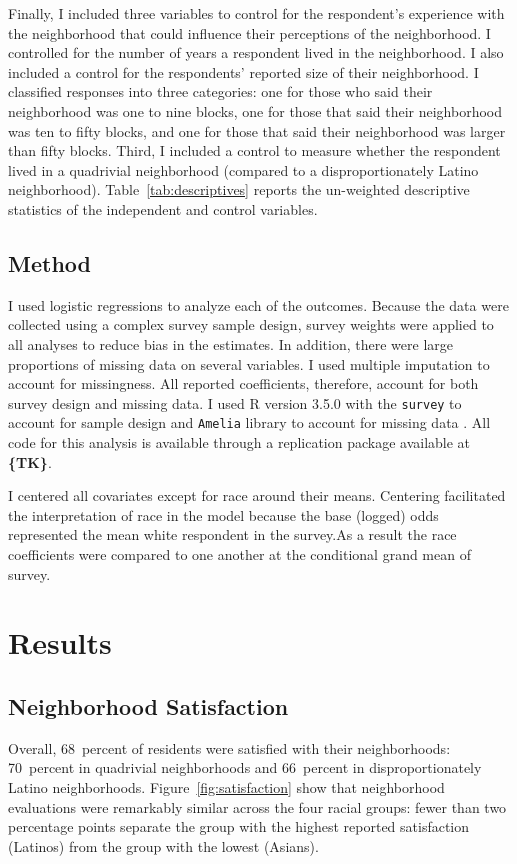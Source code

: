 \documentclass[11pt]{baderart}
\newcommand{\TK}{\textbf{\{TK\}}}
\begin{document}
Finally, I included three variables to control for the respondent's experience with the neighborhood that could influence their perceptions of the neighborhood. I controlled for the number of years a respondent lived in the neighborhood. I also included a control for the respondents' reported size of their neighborhood. I classified responses into three categories: one for those who said their neighborhood was one to nine blocks, one for those that said their neighborhood was ten to fifty blocks, and one for those that said their neighborhood was larger than fifty blocks. Third, I included a control to measure whether the respondent lived in a quadrivial neighborhood (compared to a disproportionately Latino neighborhood). Table~\ref{tab:descriptives} reports the un-weighted descriptive statistics of the independent and control variables. 


\subsection{Method}
I used logistic regressions to analyze each of the outcomes. Because the data were collected using a complex survey sample design, survey weights were applied to all analyses to reduce bias in the estimates. In addition, there were large proportions of missing data on several variables. I used multiple imputation to account for missingness. All reported coefficients, therefore, account for both survey design and missing data. I used R version 3.5.0 with the \texttt{survey} to account for sample design and \texttt{Amelia} library to account for missing data \needcite. All code for this analysis is available through a replication package available at \TK.

I centered all covariates except for race around their means. Centering facilitated the interpretation of race in the model because the base (logged) odds represented the mean white respondent in the survey.As a result the race coefficients were compared to one another at the conditional grand mean of survey. 

\section{Results}
\subsection{Neighborhood Satisfaction}
Overall, 68~percent of residents were satisfied with their neighborhoods: 70~percent in quadrivial neighborhoods and 66~percent in disproportionately Latino neighborhoods. Figure~\ref{fig:satisfaction} show that neighborhood evaluations were remarkably similar across the four racial groups: fewer than two percentage points separate the group with the highest reported satisfaction (Latinos) from the group with the lowest (Asians). 
\end{document}
